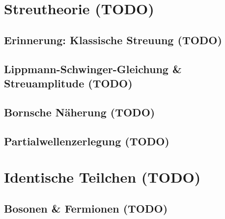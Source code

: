 \documentclass{report}
\begin{document}
\chapter{Streutheorie (TODO)}
\section{Erinnerung: Klassische Streuung (TODO)}
\section{Lippmann-Schwinger-Gleichung \& Streuamplitude (TODO)}
\section{Bornsche Näherung (TODO)}
\section{Partialwellenzerlegung (TODO)}
\chapter{Identische Teilchen (TODO)}
\section{Bosonen \& Fermionen (TODO)}
\printbibliography
\end{document}
